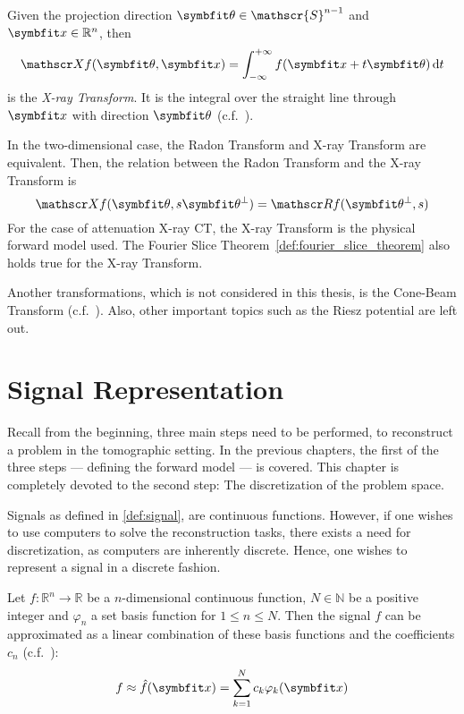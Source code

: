 \begin{definition}\label{def:x-ray_transform}
	Given the projection direction \(\mvec{\theta} \in \mathscr{S}^{n-1}\) and \(\mvec{x} \in
	\mathbb{R}^n\), then
	\[ \xray f(\mvec{\theta}, \mvec{x}) = \int_{-\infty}^{+\infty} f(\mvec{x} + t \mvec{\theta}) \, \mathrm{d} t \]
	is the \textit{X-ray Transform}. It is the integral over the straight line through
	\(\mvec{x}\) with direction \(\mvec{\theta}\)
	(c.f.~\cite{natterer_mathematics_1986,solmon_x-ray_1976}).
\end{definition}

In the two-dimensional case, the Radon Transform and X-ray Transform are equivalent.
Then, the relation between the Radon Transform and the X-ray Transform is
\begin{equation}
	\xray f(\mvec{\theta}, s\mvec{\theta}^\perp) = \radon f(\mvec{\theta}^\perp, s)
\end{equation}
For the case of attenuation X-ray CT, the X-ray Transform is the physical forward model used. The
Fourier Slice Theorem~\ref{def:fourier_slice_theorem} also holds true for the X-ray Transform.

Another transformations, which is not considered in this thesis, is the Cone-Beam Transform
(c.f.~\cite[Chapter~2]{carpio_inverse_2008}). Also, other important topics such as the Riesz
potential are left out.

\chapter{Signal Representation}\label{chap:signal_representation}

Recall from the beginning, three main steps need to be performed, to reconstruct a problem in the
tomographic setting. In the previous chapters, the first of the three steps --- defining the forward
model --- is covered. This chapter is completely devoted to the second step: The discretization of
the problem space.

Signals as defined in \autoref{def:signal}, are continuous functions. However, if one wishes to use
computers to solve the reconstruction tasks, there exists a need for discretization, as computers
are inherently discrete. Hence, one wishes to represent a signal in a discrete fashion.

\begin{definition}\label{def:permissible_representation}
	Let \(f\colon \mathbb{R}^n \to \mathbb{R}\) be a \(n\)-dimensional continuous function,
	\(N \in \mathbb{N}\) be a positive integer and \(\varphi_n\) a set basis function for
	\(1 \leq n \leq N\). Then the signal \(f\) can be approximated as a linear combination
	of these basis functions and the coefficients \(c_n\) (c.f.\ \cite{herman_basis_2015}):
	\[ f \approx \near{f}(\mvec{x}) = \sum_{k=1}^{N} c_k \varphi_k(\mvec{x}) \]
\end{definition}

